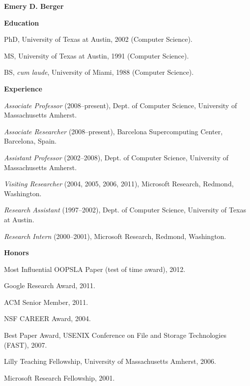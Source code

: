\documentclass[11pt]{article}
\begin{document}
\begin{center}
{\bf\textsf{Emery D. Berger}} \\[1ex]
\end{center}

\begin{description}
\setlength{\labelsep}{0ex}
\setlength{\itemsep}{-0.5ex}

\item {\bf\textsf{Education}} 


\item PhD, University of Texas at Austin, 2002 (Computer Science).
\item MS,  University of Texas at Austin, 1991 (Computer Science).
\item BS, \emph{cum laude}, University of Miami, 1988 (Computer
  Science).  

\end{description}

\begin{description}
\setlength{\labelsep}{0ex}
\setlength{\itemsep}{-0.5ex}

\item {\bf\textsf {Experience}} 

\item {\em Associate Professor} (2008--present), Dept. of Computer Science,
University of Massachusetts Amherst.
\item {\em Associate Researcher} (2008--present), Barcelona Supercomputing Center, Barcelona, Spain.
\item {\em Assistant Professor} (2002--2008), Dept. of Computer Science,
University of Massachusetts Amherst.
\item {\em Visiting Researcher} (2004, 2005, 2006, 2011), Microsoft Research, Redmond, Washington.
\item {\em Research Assistant} (1997--2002), Dept. of Computer Science, University of Texas at Austin.
\item {\em Research Intern} (2000--2001), Microsoft Research, Redmond, Washington.
\end{description}


\begin{description}
\setlength{\labelsep}{0ex}
\setlength{\itemsep}{-0.5ex}

\item {\bf\textsf {Honors}}
\item Most Influential OOPSLA Paper (test of time award), 2012.
\item Google Research Award, 2011.
\item ACM Senior Member, 2011.
\item NSF CAREER Award, 2004.
\item Best Paper Award, USENIX Conference on File and Storage Technologies (FAST), 2007.
\item Lilly Teaching Fellowship, University of Massachusetts Amherst, 2006.
\item Microsoft Research Fellowship, 2001.
\end{description}
\end{document}

